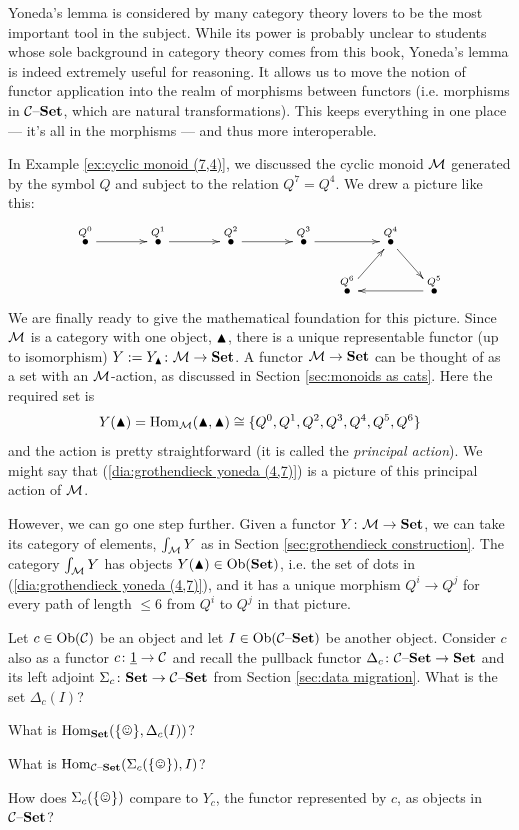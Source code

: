 \documentclass[CT4S-EN-RU]{subfiles}
\begin{document}
Yoneda's lemma is considered by many category theory lovers to be the most important tool in the subject. While its power is probably unclear to students whose sole background in category theory comes from this book, Yoneda's lemma is indeed extremely useful for reasoning. It allows us to move the notion of functor application into the realm of morphisms between functors (i.e. morphisms in $\mathcal{C}{\text \textendash}{\bf Set}$, which are natural transformations). This keeps everything in one place — it's all in the morphisms — and thus more interoperable.

\begin{example}\label{ex:yoneda for cyclic monoid}

In Example \ref{ex:cyclic monoid (7,4)}, we discussed the cyclic monoid $\mathcal{M}$ generated by the symbol $Q$ and subject to the relation $Q^7=Q^4$. We drew a picture like this: 
\begin{align}\label{dia:grothendieck yoneda (4,7)}
\xymatrix@=15pt{
\LMO{Q^0}\ar[rr]&&\LMO{Q^1}\ar[rr]&&\LMO{Q^2}\ar[rr]&&\LMO{Q^3}\ar[rr]&&\LMO{Q^4}\ar[dr]\\
&&&&&&&\LMO{Q^6}\ar[ur]&&\LMO{Q^5}\ar[ll]
}
\end{align}
We are finally ready to give the mathematical foundation for this picture. Since $\mathcal{M}$ is a category with one object, $\blacktriangle$, there is a unique representable functor (up to isomorphism) $Y:=Y_\blacktriangle\colon\mathcal{M}\rightarrow{\bf Set}$. A functor $\mathcal{M}\rightarrow{\bf Set}$ can be thought of as a set with an $\mathcal{M}$-action, as discussed in Section \ref{sec:monoids as cats}. Here the required set is 
$$Y(\blacktriangle)=\textnormal{Hom}_\mathcal{M}(\blacktriangle,\blacktriangle)\cong\{Q^0,Q^1,Q^2,Q^3,Q^4,Q^5,Q^6\}$$ 
and the action is pretty straightforward (it is called the {\em principal action}). We might say that (\ref{dia:grothendieck yoneda (4,7)}) is a picture of this principal action of $\mathcal{M}$. 

However, we can go one step further. Given a functor $Y\colon\mathcal{M}\rightarrow{\bf Set}$, we can take its category of elements, $\int_\mathcal{M} Y$ as in Section \ref{sec:grothendieck construction}. The category $\int_\mathcal{M} Y$ has objects $Y(\blacktriangle)\in\textnormal{Ob}({\bf Set})$, i.e. the set of dots in (\ref{dia:grothendieck yoneda (4,7)}), and it has a unique morphism $Q^i\to Q^j$ for every path of length $\leq 6$ from $Q^i$ to $Q^j$ in that picture.

\end{example}

\begin{exercise}

Let $c\in\textnormal{Ob}(\mathcal{C})$ be an object and let $I\in\textnormal{Ob}(\mathcal{C}{\text \textendash}{\bf Set})$ be another object. Consider $c$ also as a functor $c\colon\underline{1}\rightarrow\mathcal{C}$ and recall the pullback functor $\Delta_c\colon\mathcal{C}{\text \textendash}{\bf Set}\rightarrow{\bf Set}$ and its left adjoint $\Sigma_c\colon{\bf Set}\rightarrow\mathcal{C}{\text \textendash}{\bf Set}$ from Section \ref{sec:data migration}.
\sexc What is the set $\Delta_c(I)$?
\item What is $\Hom_\Set(\singleton,\Delta_c(I))$?
\item What is $\Hom_{\mcC\set}(\Sigma_c(\singleton),I)$?
\item How does $\Sigma_c(\singleton)$ compare to $Y_c$, the functor represented by $c$, as objects in $\mathcal{C}{\text \textendash}{\bf Set}$?
\endsexc
\end{exercise}
\end{document}
